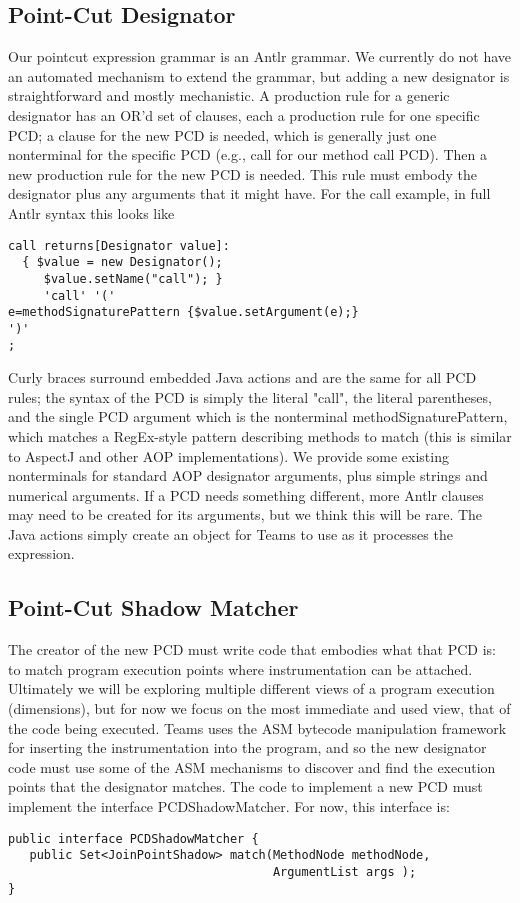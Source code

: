 \documentclass{report}
\begin{document}
\subsection{Point-Cut Designator} 
Our pointcut expression grammar is an Antlr grammar. We currently do not have an automated mechanism to extend the grammar, but adding a new designator is straightforward and mostly mechanistic. A production rule for a generic designator has an OR'd set of clauses, each a production rule for one specific PCD; a clause for the new PCD is needed, which is generally just one nonterminal for the specific PCD (e.g., call for our method call PCD). Then a new production rule for the new PCD is needed. This rule must embody the designator plus any arguments that it might have. For the call example, in full Antlr syntax this looks like
\begin{verbatim}
call returns[Designator value]:
  { $value = new Designator();
     $value.setName("call"); }
     'call' '('
e=methodSignaturePattern {$value.setArgument(e);}
')'
;
\end{verbatim}

Curly braces surround embedded Java actions and are the same for all PCD rules; the syntax of the PCD is simply the literal "call", the literal parentheses, and the single PCD argument which is the nonterminal methodSignaturePattern, which matches a RegEx-style pattern describing methods to match (this is similar to AspectJ and other AOP implementations). We provide some existing nonterminals for standard AOP designator arguments, plus simple strings and numerical arguments. If a PCD needs something different, more Antlr clauses may need to be created for its arguments, but we think this will be rare. The Java actions simply create an object for Teams to use as it processes the expression.

\subsection{Point-Cut Shadow Matcher} 
The creator of the new PCD must write code that embodies what that PCD is: to match program execution points where instrumentation can be attached. Ultimately we will be exploring multiple different views of a program execution (dimensions), but for now we focus on the most immediate and used view, that of the code being executed. Teams uses the ASM bytecode manipulation framework for inserting the instrumentation into the program, and so the new designator code must use some of the ASM mechanisms to discover and find the execution points that the designator matches. The code to implement a new PCD must implement the interface PCDShadowMatcher. For now, this interface is:
\begin{verbatim}
public interface PCDShadowMatcher {
   public Set<JoinPointShadow> match(MethodNode methodNode,
                                     ArgumentList args );
}
\end{verbatim}
\end{document}
